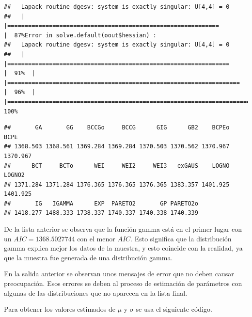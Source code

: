 \documentclass[
]{book}
\makeatletter
\newenvironment{Shaded}{\begin{snugshade}}{\end{snugshade}}
\newcommand{\NormalTok}[1]{#1}
\newcommand{\SpecialCharTok}[1]{\textcolor[rgb]{0.00,0.00,0.00}{#1}}
\newenvironment{kframe}{%
\medskip{}
\setlength{\fboxsep}{.8em}
 \def\at@end@of@kframe{}%
 \ifinner\ifhmode%
  \def\at@end@of@kframe{\end{minipage}}%
  \begin{minipage}{\columnwidth}%
 \fi\fi%
 \def\FrameCommand##1{\hskip\@totalleftmargin \hskip-\fboxsep
 \colorbox{shadecolor}{##1}\hskip-\fboxsep
     \hskip-\linewidth \hskip-\@totalleftmargin \hskip\columnwidth}%
 \MakeFramed {\advance\hsize-\width
   \@totalleftmargin\z@ \linewidth\hsize
   \@setminipage}}%
 {\par\unskip\endMakeFramed%
 \at@end@of@kframe}
\renewenvironment{Shaded}{\begin{kframe}}{\end{kframe}}
\newenvironment{rmdblock}[1]
  {
  \begin{itemize}
  \renewcommand{\labelitemi}{
    \raisebox{-.7\height}[0pt][0pt]{
      {\setkeys{Gin}{width=3em,keepaspectratio}\texttt{[image: images/\#1]}}
    }
  }
  \setlength{\fboxsep}{1em}
  \begin{kframe}
  \item
  }
  {
  \end{kframe}
  \end{itemize}
  }
\newenvironment{rmdnote}
  {\begin{rmdblock}{note}}
  {\end{rmdblock}}
\makeatother
\begin{document}
\begin{verbatim}
##   Lapack routine dgesv: system is exactly singular: U[4,4] = 0
##   |                                                                              |=============================================================         |  87%Error in solve.default(oout$hessian) : 
##   Lapack routine dgesv: system is exactly singular: U[4,4] = 0
##   |                                                                              |================================================================      |  91%  |                                                                              |===================================================================   |  96%  |                                                                              |======================================================================| 100%
\end{verbatim}

\begin{Shaded}
\end{Shaded}

\begin{verbatim}
##       GA       GG    BCCGo     BCCG      GIG      GB2    BCPEo     BCPE 
## 1368.503 1368.561 1369.284 1369.284 1370.503 1370.562 1370.967 1370.967 
##      BCT     BCTo      WEI     WEI2     WEI3   exGAUS    LOGNO   LOGNO2 
## 1371.284 1371.284 1376.365 1376.365 1376.365 1383.357 1401.925 1401.925 
##       IG   IGAMMA      EXP  PARETO2       GP PARETO2o 
## 1418.277 1488.333 1738.337 1740.337 1740.338 1740.339
\end{verbatim}

De la lista anterior se observa que la función gamma está en el primer lugar con un \(AIC=1368.5027744\) con el menor \(AIC\). Esto significa que la distribución gamma explica mejor los datos de la muestra, y esto coincide con la realidad, ya que la muestra fue generada de una distribución gamma.

\begin{rmdnote}
En la salida anterior se observan unos mensajes de error que no deben causar preocupación. Esos errores se deben al proceso de estimación de parámetros con algunas de las distribuciones que no aparecen en la lista final.
\end{rmdnote}

Para obtener los valores estimados de \(\mu\) y \(\sigma\) se usa el siguiente código.
\end{document}
